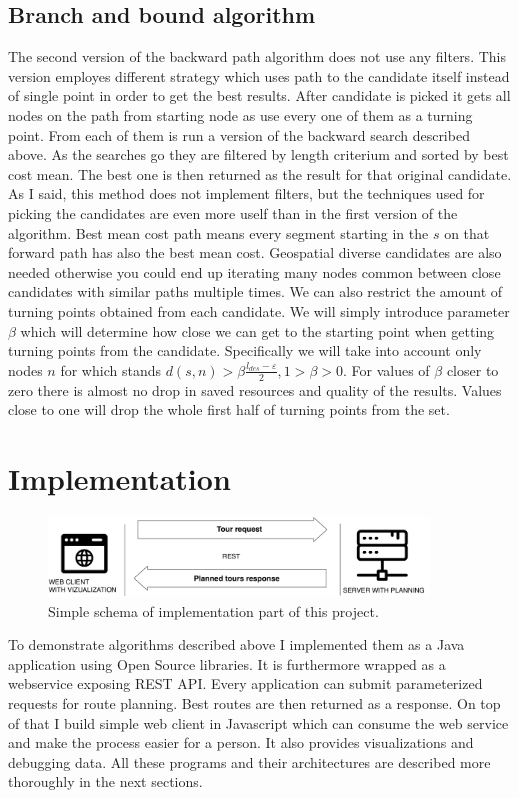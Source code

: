 \documentclass{ctuthesis}
\begin{document}
\section{Branch and bound algorithm}
The second version of the backward path algorithm does not use any filters. This version employes different strategy which uses path to the candidate itself instead of single point in order to get the best results. After candidate is picked it gets all nodes on the path from starting node as use every one of them as a turning point. From each of them is run a version of the backward search described above. As the searches go they are filtered by length criterium and sorted by best cost mean. The best one is then returned as the result for that original candidate.
As I said, this method does not implement filters, but the techniques used for picking the candidates are even more uself than in the first version of the algorithm. Best mean cost path means every segment starting in the \(s\) on that forward path has also the best mean cost. Geospatial diverse candidates are also needed otherwise you could end up iterating many nodes common between close candidates with similar paths multiple times.
We can also restrict the amount of turning points obtained from each candidate. We will simply introduce parameter \(\beta\) which will determine how close we can get to the starting point when getting turning points from the candidate. Specifically we will take into account only nodes \(n\) for which stands \(d(s, n) > \beta\frac {l_{des}-\varepsilon} 2, 1 > \beta > 0\). For values of \(\beta\) closer to zero there is almost no drop in saved resources and quality of the results. Values close to one will drop the whole first half of turning points from the set. 


\chapter{Implementation}
\begin{figure}[H]
	\includegraphics[width=0.9\textwidth]{communication}
	\caption{Simple schema of implementation part of this project.}
\end{figure}

To demonstrate algorithms described above I implemented them as a Java application using Open Source libraries. It is furthermore wrapped as a webservice exposing REST API. Every application can submit parameterized requests for route planning. Best routes are then returned as a response. On top of that I build simple web client in Javascript which can consume the web service and make the process easier for a person. It also provides visualizations and debugging data. All these programs and their architectures are described more thoroughly in the next sections.
\end{document}

